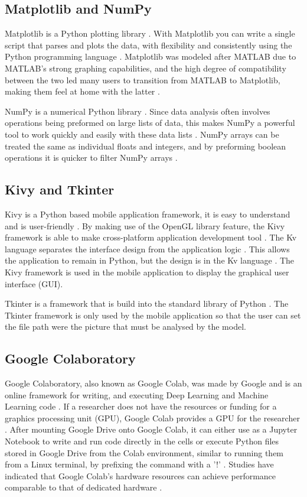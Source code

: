 \documentclass[conference]{IEEEtran}
\begin{document}
\subsection{Matplotlib and NumPy}

Matplotlib is a Python plotting library \cite{b8}. With Matplotlib you can write a single script that parses and plots the data, with flexibility and consistently using the Python programming language \cite{b12}. Matplotlib was modeled after MATLAB due to MATLAB's strong graphing capabilities, and the high degree of compatibility between the two led many users to transition from MATLAB to Matplotlib, making them feel at home with the latter \cite{b12}.

NumPy is a numerical Python library \cite{b8}. Since data analysis often involves operations being preformed on large lists of data, this makes NumPy a powerful tool to work quickly and easily with these data lists \cite{b8}. NumPy arrays can be treated the same as individual floats and integers, and by preforming boolean operations it is quicker to filter NumPy arrays \cite{b8}.

\subsection{Kivy and Tkinter}

Kivy is a Python based mobile application framework, it is easy to understand and is user-friendly \cite{b13}. By making use of the OpenGL library feature, the Kivy framework is able to make cross-platform application development tool \cite{b13}. The Kv language separates the interface design from the application logic \cite{b14}. This allows the application to remain in Python, but the design is in the Kv language \cite{b14}. The Kivy framework is used in the mobile application to display the graphical user interface (GUI).

Tkinter is a framework that is build into the standard library of Python \cite{b15}. The Tkinter framework is only used by the mobile application so that the user can set the file path were the picture that must be analysed by the model.

\subsection{Google Colaboratory}

Google Colaboratory, also known as Google Colab, was made by Google and is an online framework for writing, and executing Deep Learning and Machine Learning code \cite{b16}. If a researcher does not have the resources or funding for a graphics processing unit (GPU), Google Colab provides a GPU for the researcher \cite{b16}. After mounting Google Drive onto Google Colab, it can either use as a Jupyter Notebook to write and run code directly in the cells or execute Python files stored in Google Drive from the Colab environment, similar to running them from a Linux terminal, by prefixing the command with a '!' \cite{b16}. Studies have indicated that Google Colab's hardware resources can achieve performance comparable to that of dedicated hardware \cite{b17}.
\end{document}
